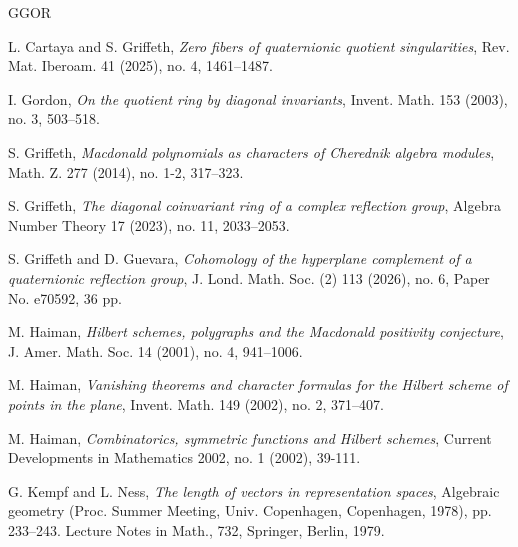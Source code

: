 \documentclass[12pt, reqno]{amsart}
\numberwithin{equation}{section}
\theoremstyle{definition}
\theoremstyle{plain}
\begin{document}
%
\def\cprime{$'$} \def\cprime{$'$}
\begin{thebibliography}{GGOR}

 L. Cartaya and S. Griffeth, \emph{Zero fibers of quaternionic quotient singularities}, Rev. Mat. Iberoam. 41 (2025), no. 4, 1461--1487.

 I. Gordon, \emph{On the quotient ring by diagonal invariants}, Invent. Math. 153 (2003), no. 3, 503--518.

 S. Griffeth, \emph{Macdonald polynomials as characters of Cherednik algebra modules}, Math. Z. 277 (2014), no. 1-2, 317--323.

 S. Griffeth, \emph{The diagonal coinvariant ring of a complex reflection group},
Algebra Number Theory 17 (2023), no. 11, 2033--2053.

 S. Griffeth and D. Guevara, \emph{Cohomology of the hyperplane complement of a quaternionic reflection group}, J. Lond. Math. Soc. (2) 113 (2026), no. 6, Paper No. e70592, 36 pp.

 M. Haiman, \emph{Hilbert schemes, polygraphs and the Macdonald positivity conjecture}, J. Amer. Math. Soc. 14 (2001), no. 4, 941--1006.

 M. Haiman, \emph{Vanishing theorems and character formulas for the Hilbert scheme of points in the plane}, Invent. Math. 149 (2002), no. 2, 371--407.

 M. Haiman, \emph{Combinatorics, symmetric functions and Hilbert schemes},
Current Developments in Mathematics 2002, no. 1 (2002), 39-111.
 
 G. Kempf and L. Ness, \emph{The length of vectors in representation spaces}, Algebraic geometry (Proc. Summer Meeting, Univ. Copenhagen, Copenhagen, 1978), pp. 233–243. Lecture Notes in Math., 732, Springer, Berlin, 1979.

 \end{thebibliography}
\end{document}
